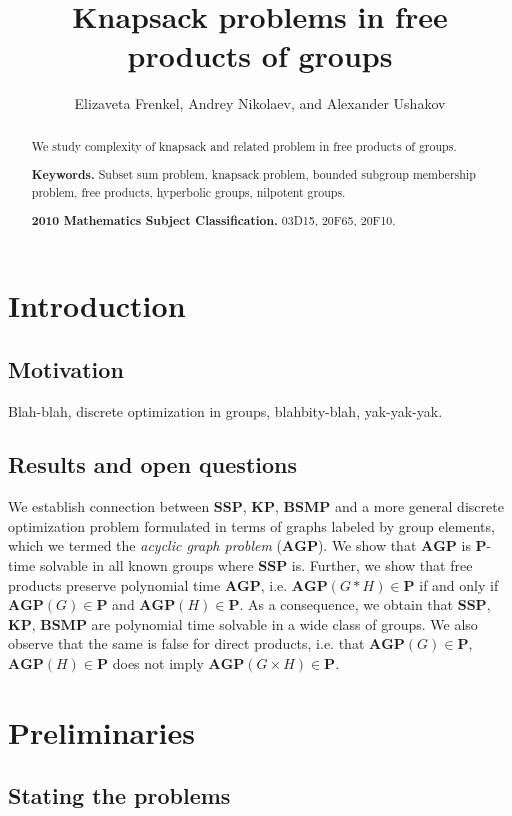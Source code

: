 \documentclass[10pt]{amsart}
\title{Knapsack problems in free products of groups}
\author[]{Elizaveta Frenkel, Andrey Nikolaev, and Alexander Ushakov}
\theoremstyle{definition}
\def\P{{\mathbf{P}}}
\def\SSP{{\mathbf{SSP}}}
\def\BSMP{{\mathbf{BSMP}}}
\def\KP{{\mathbf{KP}}}
\def\AGP{{\mathbf{AGP}}}
\begin{document}
\maketitle

\begin{abstract}
We study complexity of knapsack and related problem in free products of groups.

\noindent
{\bf Keywords.} Subset sum problem,  knapsack problem, bounded subgroup membership problem, free products, hyperbolic groups, nilpotent groups.

\noindent
{\bf 2010 Mathematics Subject Classification.} 03D15, 20F65, 20F10.
\end{abstract}

\tableofcontents

\section{Introduction}\label{sec:intro}


\subsection{Motivation}\label{sub:motivation}
Blah-blah, discrete optimization in groups, blahbity-blah, yak-yak-yak.

\subsection{Results and open questions}\label{sub:results}
We establish connection between $\SSP$, $\KP$, $\BSMP$ and a more general discrete optimization problem formulated in terms of graphs labeled by group elements, which we termed the {\em acyclic graph problem} ($\AGP$). We show that $\AGP$ is $\P$-time solvable in all known groups where $\SSP$ is. Further, we show that free products preserve polynomial time $\AGP$, i.e. $\AGP(G* H)\in\P$ if and only if $\AGP(G)\in\P$ and $\AGP(H)\in\P$. As a consequence, we obtain that $\SSP$, $\KP$, $\BSMP$ are polynomial time solvable in a wide class of groups. We also observe that the same is false for direct products, i.e. that $\AGP(G)\in\P$, $\AGP(H)\in\P$ does not imply $\AGP(G\times H)\in\P$.


\section{Preliminaries}\label{sec:prelim}
\subsection{Stating the problems} \label{sec:problems}
\end{document}
